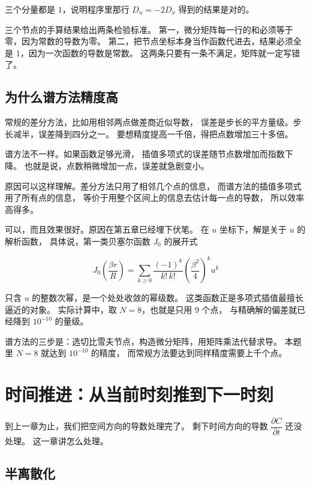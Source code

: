 三个分量都是 $1$，说明程序里那行 $D_u=-2D_x$ 得到的结果是对的。

\keypoint
三个节点的手算结果给出两条检验标准。
第一，微分矩阵每一行的和必须等于零，因为常数的导数为零。
第二，把节点坐标本身当作函数代进去，结果必须全是 $1$，因为一次函数的导数是常数。
这两条只要有一条不满足，矩阵就一定写错了。

\subsection{为什么谱方法精度高}

常规的差分方法，比如用相邻两点做差商近似导数，
误差是步长的平方量级。步长减半，误差降到四分之一。
要想精度提高一千倍，得把点数增加三十多倍。

谱方法不一样。如果函数足够光滑，
插值多项式的误差随节点数增加而指数下降。
也就是说，点数稍微增加一点，误差就急剧变小。

原因可以这样理解。差分方法只用了相邻几个点的信息，
而谱方法的插值多项式用了所有点的信息，
等价于用整个区间上的信息去估计每一点的导数，
所以效率高得多。

可以，而且效果很好。原因在第五章已经埋下伏笔。
在 $u$ 坐标下，解是关于 $u$ 的解析函数，
具体说，第一类贝塞尔函数 $J_0$ 的展开式

\begin{equation}
J_0\!\left(\frac{\beta r}{R}\right)
= \sum_{k\ge0}\frac{(-1)^k}{k!\,k!}\left(\frac{\beta^2}{4}\right)^{k}u^{k}
\end{equation}

只含 $u$ 的整数次幂，是一个处处收敛的幂级数。
这类函数正是多项式插值最擅长逼近的对象。
实际计算中，取 $N=8$，也就是只用 $9$ 个点，
与精确解的偏差就已经降到 $10^{-10}$ 的量级。

\keypoint
谱方法的三步是：选切比雪夫节点，构造微分矩阵，用矩阵乘法代替求导。
本题里 $N=8$ 就达到 $10^{-10}$ 的精度，
而常规方法要达到同样精度需要上千个点。

\section{时间推进：从当前时刻推到下一时刻}

到上一章为止，我们把空间方向的导数处理完了。
剩下时间方向的导数 $\dfrac{\partial C}{\partial t}$ 还没处理。
这一章讲怎么处理。

\subsection{半离散化}

